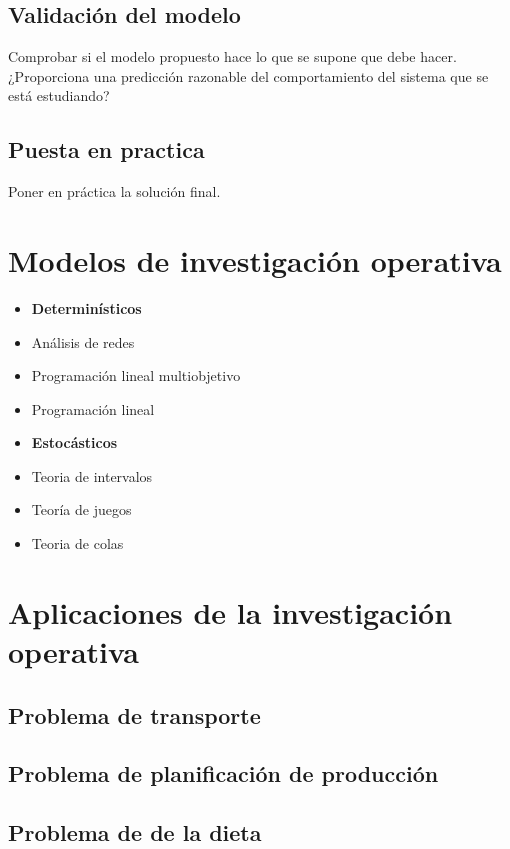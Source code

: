 \documentclass{article}
\begin{document}
\subsection{Validación del modelo}
Comprobar si el modelo propuesto hace lo que se supone que debe hacer.
¿Proporciona una predicción razonable del comportamiento del sistema que se está estudiando?
\subsection{Puesta en practica}
Poner en práctica la solución final.
\section{Modelos de investigación operativa}
\begin{minipage}[b]{0.5\linewidth}
\begin{itemize}
\item \textbf{Determinísticos}
\item Análisis de redes
\item Programación lineal multiobjetivo
\item Programación lineal
\end{itemize}
    \end{minipage} 
    \begin{minipage}[b]{0.5\linewidth} 
\begin{itemize}
\item \textbf{Estocásticos}
\item Teoria de intervalos
\item Teoría de juegos
\item Teoria de colas
\end{itemize}    
\end{minipage}

\section{Aplicaciones de la investigación operativa}
\subsection{Problema de transporte}
\subsection{Problema de planificación de producción}
\subsection{Problema de de la dieta}
\end{document}
